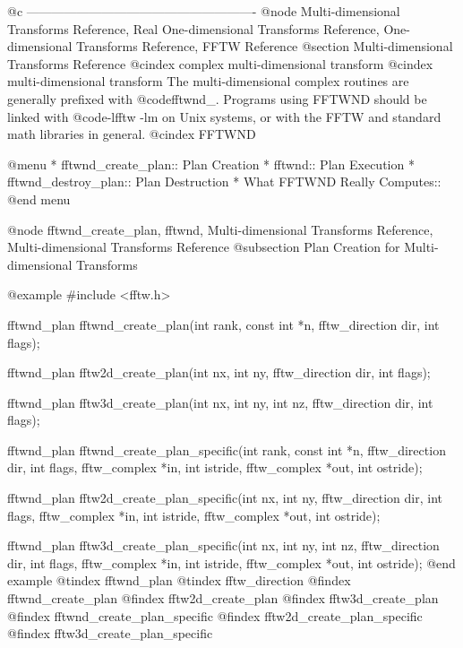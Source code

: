 @c -------------------------------------------------------
@node Multi-dimensional Transforms Reference, Real One-dimensional Transforms Reference, One-dimensional Transforms Reference, FFTW Reference
@section Multi-dimensional Transforms Reference
@cindex complex multi-dimensional transform
@cindex multi-dimensional transform
The multi-dimensional complex routines are generally prefixed with
@code{fftwnd_}.  Programs using FFTWND should be linked with @code{-lfftw
-lm} on Unix systems, or with the FFTW and standard math libraries in
general.
@cindex FFTWND

@menu
* fftwnd_create_plan::          Plan Creation
* fftwnd::                      Plan Execution
* fftwnd_destroy_plan::         Plan Destruction
* What FFTWND Really Computes::  
@end menu

@node   fftwnd_create_plan, fftwnd, Multi-dimensional Transforms Reference, Multi-dimensional Transforms Reference
@subsection Plan Creation for Multi-dimensional Transforms

@example
#include <fftw.h>

fftwnd_plan fftwnd_create_plan(int rank, const int *n,
                               fftw_direction dir, int flags);

fftwnd_plan fftw2d_create_plan(int nx, int ny,
                               fftw_direction dir, int flags);

fftwnd_plan fftw3d_create_plan(int nx, int ny, int nz,
                               fftw_direction dir, int flags);

fftwnd_plan fftwnd_create_plan_specific(int rank, const int *n,
                                        fftw_direction dir,
                                        int flags,
                                        fftw_complex *in, int istride,
                                        fftw_complex *out, int ostride);

fftwnd_plan fftw2d_create_plan_specific(int nx, int ny,
                                        fftw_direction dir,
                                        int flags,
                                        fftw_complex *in, int istride,
                                        fftw_complex *out, int ostride);

fftwnd_plan fftw3d_create_plan_specific(int nx, int ny, int nz,
                                        fftw_direction dir, int flags,
                                        fftw_complex *in, int istride,
                                        fftw_complex *out, int ostride);
@end example
@tindex fftwnd_plan
@tindex fftw_direction
@findex fftwnd_create_plan
@findex fftw2d_create_plan
@findex fftw3d_create_plan
@findex fftwnd_create_plan_specific
@findex fftw2d_create_plan_specific
@findex fftw3d_create_plan_specific

